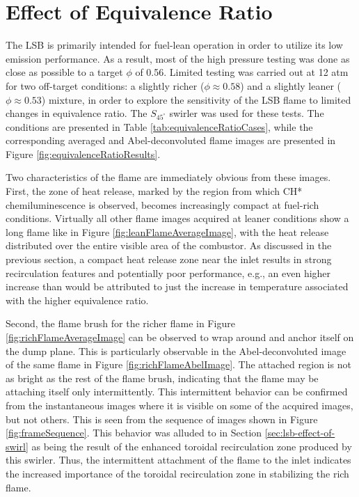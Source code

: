 \section{Effect of Equivalence Ratio}
\label{sec:lsb-effect-of-equivalence-ratio}

The LSB is primarily intended for fuel-lean operation in order to utilize its low  emission performance.
As a result, most of the high pressure testing was done as close as possible to a target \(\phi\) of 0.56.
Limited testing was carried out at 12 atm for two off-target conditions: a slightly richer (\(\phi \approx 0.58\)) and a slightly leaner (\(\phi \approx 0.53\)) mixture, in order to explore the sensitivity of the LSB flame to limited changes in equivalence ratio.
The \(S_{45^\circ}\) swirler was used for these tests.
The conditions are presented in Table \ref{tab:equivalenceRatioCases}, while the corresponding averaged and Abel-deconvoluted flame images are presented in Figure \ref{fig:equivalenceRatioResults}.




Two characteristics of the flame are immediately obvious from these images.
First, the zone of heat release, marked by the region from which CH* chemiluminescence is observed, becomes increasingly compact at fuel-rich conditions.
Virtually all other flame images acquired at leaner conditions show a long flame like in Figure \ref{fig:leanFlameAverageImage}, with the heat release distributed over the entire visible area of the combustor.
As discussed in the previous section, a compact heat release zone near the inlet results in strong recirculation features and potentially poor  performance, e.g., an even higher  increase than would be attributed to just the increase in temperature associated with the higher equivalence ratio.

Second, the flame brush for the richer flame in Figure \ref{fig:richFlameAverageImage} can be observed to wrap around and anchor itself on the dump plane.
This is particularly observable in the Abel-deconvoluted image of the same flame in Figure \ref{fig:richFlameAbelImage}.
The attached region is not as bright as the rest of the flame brush, indicating that the flame may be attaching itself only intermittently.
This intermittent behavior can be confirmed from the instantaneous images where it is visible on some of the acquired images, but not others.
This is seen from the sequence of images shown in Figure \ref{fig:frameSequence}.
This behavior was alluded to in Section \ref{sec:lsb-effect-of-swirl} as being the result of the enhanced toroidal recirculation zone produced by this swirler.
Thus, the intermittent attachment of the flame to the inlet indicates the increased importance of the toroidal recirculation zone in stabilizing the rich flame.

